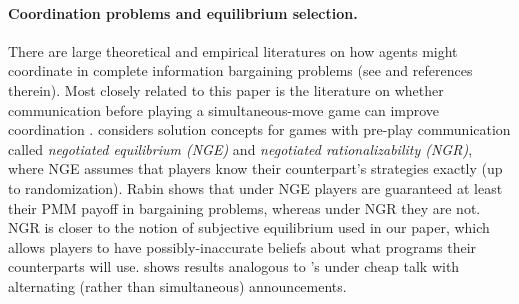\documentclass[sigconf]{aamas}
\theoremstyle{definition}
\begin{document}
\paragraph{Coordination problems and equilibrium selection.}
There are large theoretical and empirical
literatures on how agents might coordinate
in complete information bargaining problems
(see
\citet{schuessler2019focal} and 
references therein). 
Most closely related to this 
paper is the literature 
on whether communication before playing 
a simultaneous-move game
can improve coordination
\citep{farrell1987cheap,Rabin1991AMO,farrell1996cheap,crawford2017let,he2019power}. 
\citet{Rabin1991AMO} considers solution concepts for games with 
pre-play communication called \textit{negotiated equilibrium (NGE)} and
\textit{negotiated rationalizability (NGR)}, where NGE assumes that
players know their counterpart's strategies exactly (up to randomization).
Rabin shows that under NGE players
are guaranteed at least their PMM payoff 
in bargaining problems, whereas under NGR they are not. NGR is closer to the 
notion of subjective equilibrium used
in
our
paper, which allows 
players to
have possibly-inaccurate beliefs about what programs their counterparts
will use.
\citet{Santos2000Jul} shows results analogous to \citet{Rabin1991AMO}'s
under cheap talk with alternating (rather than simultaneous) announcements.
\end{document}
